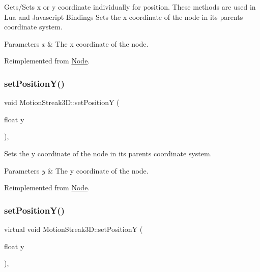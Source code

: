 Gets/\+Sets x or y coordinate individually for position. These methods are used in Lua and Javascript Bindings Sets the x coordinate of the node in its parent\textquotesingle{}s coordinate system.


\begin{DoxyParams}{Parameters}
{\em x} & The x coordinate of the node. \\
\hline
\end{DoxyParams}


Reimplemented from \hyperlink{classNode_ae1dfc73d6122a95778d5d9db3d1fd913}{Node}.

\mbox{\label{classMotionStreak3D_afb3de2f3e93486b5be3877d081159d57}} 
\subsubsection{\texorpdfstring{set\+Position\+Y()}{setPositionY()}\hspace{0.1cm}{\footnotesize\ttfamily [1/2]}}
{\footnotesize\ttfamily void Motion\+Streak3\+D\+::set\+PositionY (\begin{DoxyParamCaption}\item[{float}]{y }\end{DoxyParamCaption})\hspace{0.3cm}{\ttfamily [override]}, {\ttfamily [virtual]}}

Sets the y coordinate of the node in its parent\textquotesingle{}s coordinate system.


\begin{DoxyParams}{Parameters}
{\em y} & The y coordinate of the node. \\
\hline
\end{DoxyParams}


Reimplemented from \hyperlink{classNode_a5c97d36655f0daa71a5f6c715d2b0470}{Node}.

\mbox{\label{classMotionStreak3D_a8f63bcfa700cf9d67907d9e6f31bace6}} 
\subsubsection{\texorpdfstring{set\+Position\+Y()}{setPositionY()}\hspace{0.1cm}{\footnotesize\ttfamily [2/2]}}
{\footnotesize\ttfamily virtual void Motion\+Streak3\+D\+::set\+PositionY (\begin{DoxyParamCaption}\item[{float}]{y }\end{DoxyParamCaption})\hspace{0.3cm}{\ttfamily [override]}, {\ttfamily [virtual]}}

